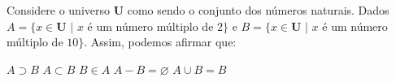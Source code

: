 Considere o universo $\mathbf{U}$ como sendo o conjunto dos números naturais. Dados $A=\{x\in\mathbf{U}\,\,|\,\,x$ é um número múltiplo de $2\}$ e $B=\{x\in\mathbf{U}\,\,|\,\,x$ é um número múltiplo de $10\}$. Assim, podemos afirmar que:

$A\supset B$
$A\subset B$
$B\in A$
$A-B=\varnothing$
$A\cup B=B$


